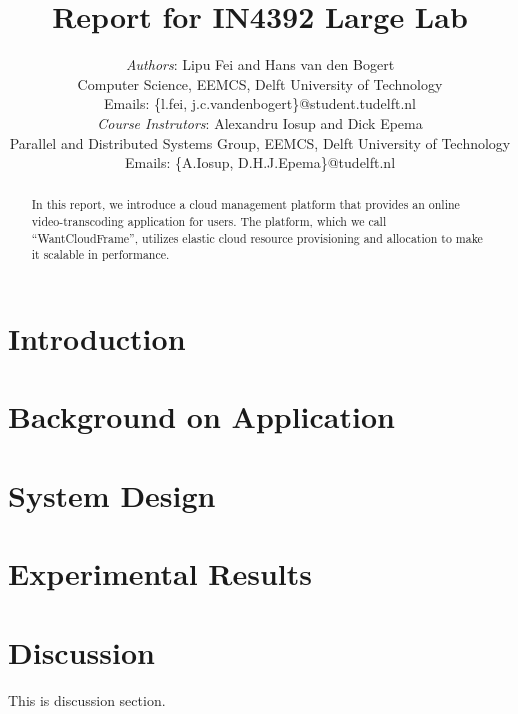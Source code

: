 \documentclass[10pt, a4paper, twoside, twocolumn, technote]{IEEEtran}
\begin{document}
\title{Report for IN4392 Large Lab}
\author{\textit{Authors}: Lipu Fei and Hans van den Bogert\\
  Computer Science, EEMCS, Delft University of Technology\\
  Emails: \{l.fei, j.c.vandenbogert\}@student.tudelft.nl\\
  \textit{Course Instrutors}: Alexandru Iosup and Dick Epema\\
  Parallel and Distributed Systems Group, EEMCS, Delft University of Technology\\
  Emails: \{A.Iosup, D.H.J.Epema\}@tudelft.nl}


\maketitle


\begin{abstract}
  In this report, we introduce a cloud management platform that
  provides an online video-transcoding application for users. The
  platform, which we call ``WantCloudFrame'', utilizes elastic cloud
  resource provisioning and allocation to make it scalable in
  performance.
\end{abstract}

\section{Introduction}


\section{Background on Application}\label{background}


\section{System Design}\label{design}


\section{Experimental Results}\label{experiment}


\section{Discussion}\label{discussion}
This is discussion section.
\end{document}
